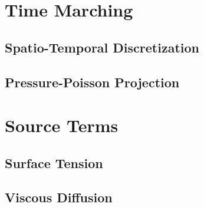 \section{Time Marching}

\subsection*{Spatio-Temporal Discretization}
\blindtext

\subsection*{Pressure-Poisson Projection}
\blindtext

\section{Source Terms}

\subsection*{Surface Tension}


\subsection*{Viscous Diffusion}

\blindtext
